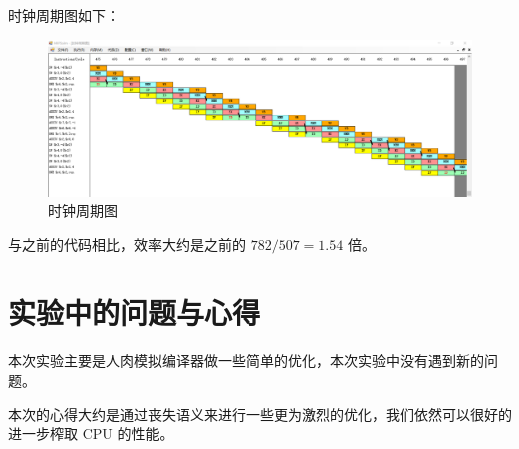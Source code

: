 \documentclass[blue,normal,cn]{elegantnote}
\begin{document}
时钟周期图如下：

\begin{figure}[H]
    \centering
    \includegraphics[width=.8\textwidth]{fig/bubble_bypass.png}
    \caption{时钟周期图}
    \label{fig:prod_bypass}
\end{figure}

与之前的代码相比，效率大约是之前的 $782 / 507 = 1.54$ 倍。

\section{实验中的问题与心得}

本次实验主要是人肉模拟编译器做一些简单的优化，本次实验中没有遇到新的问题。

本次的心得大约是通过丧失语义来进行一些更为激烈的优化，我们依然可以很好的进一步榨取 CPU 的性能。
\end{document}
